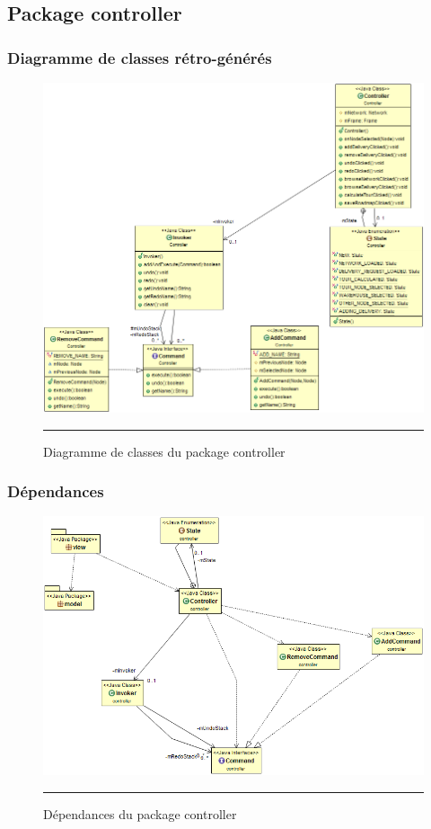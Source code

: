 \subsection{Package controller}
\subsubsection{Diagramme de classes rétro-générés}
\begin{figure}[H]
	\centering
		\includegraphics[width=\textwidth,height=\textheight,keepaspectratio]{Figures/retro_controller}
		\rule{35em}{0.5pt}
	\caption[Diagramme de classes du package controller]{Diagramme de classes du package controller}
\end{figure}
\subsubsection{Dépendances}

\begin{figure}[H]
	\centering
		\includegraphics[width=\textwidth,height=\textheight,keepaspectratio]{Figures/retro_controller_dep}
		\rule{35em}{0.5pt}
	\caption[Dépendances du package controller]{Dépendances du package controller}
\end{figure}


